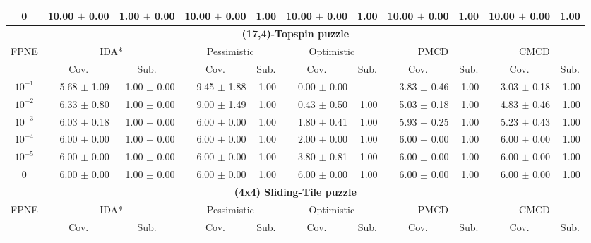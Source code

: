\documentclass[letterpaper]{article}
\begin{document}
\begin{table}[t]
\begin{tabular}{| c | r  r | r  r | r  r | r  r | r  r |}
0 	& 10.00 $\pm$ 0.00	& 1.00  $\pm$ 0.00 	& 10.00 $\pm$ 0.00	& 1.00 	& 10.00 $\pm$ 0.00	& 1.00 	& 10.00 $\pm$ 0.00	& 1.00 	& 10.00 $\pm$ 0.00	& 1.00 	\\

\hline
\hline
\multicolumn{11}{|c|}{\textbf{(17,4)-Topspin puzzle}} \\
\hline
\multirow{2}{*}{FPNE}	& \multicolumn{2}{|c|}{IDA*} 	& \multicolumn{2}{|c|}{Pessimistic} 	& \multicolumn{2}{|c|}{Optimistic} 	& \multicolumn{2}{|c|}{PMCD} 	& \multicolumn{2}{|c|}{CMCD} 	\\
\cline{2-11}
	& \multicolumn{1}{c}{Cov.} & \multicolumn{1}{c|}{Sub.} 	& \multicolumn{1}{c}{Cov.} & \multicolumn{1}{c|}{Sub.} 	& \multicolumn{1}{c}{Cov.} & \multicolumn{1}{c|}{Sub.} 	& \multicolumn{1}{c}{Cov.} & \multicolumn{1}{c|}{Sub.} 	& \multicolumn{1}{c}{Cov.} & \multicolumn{1}{c|}{Sub.} 	\\
\hline
$10^{-1}$	& 5.68 $\pm$ 1.09	& 1.00 $\pm$ 0.00	& 9.45 $\pm$ 1.88	& 1.00	& 0.00 $\pm$ 0.00	& - 	& 3.83 $\pm$ 0.46	& 1.00	& 3.03 $\pm$ 0.18	& 1.00	\\

$10^{-2}$	& 6.33 $\pm$ 0.80	& 1.00 $\pm$ 0.00	& 9.00 $\pm$ 1.49	& 1.00	& 0.43 $\pm$ 0.50	& 1.00	& 5.03 $\pm$ 0.18	& 1.00	& 4.83 $\pm$ 0.46	& 1.00	\\

$10^{-3}$	& 6.03 $\pm$ 0.18	& 1.00 $\pm$ 0.00	& 6.00 $\pm$ 0.00	& 1.00	& 1.80 $\pm$ 0.41	& 1.00	& 5.93 $\pm$ 0.25	& 1.00	& 5.23 $\pm$ 0.43	& 1.00	\\

$10^{-4}$	& 6.00 $\pm$ 0.00	& 1.00 $\pm$ 0.00	& 6.00 $\pm$ 0.00	& 1.00	& 2.00 $\pm$ 0.00	& 1.00	& 6.00 $\pm$ 0.00	& 1.00	& 6.00 $\pm$ 0.00	& 1.00	\\

$10^{-5}$	& 6.00 $\pm$ 0.00	& 1.00 $\pm$ 0.00	& 6.00 $\pm$ 0.00	& 1.00	& 3.80 $\pm$ 0.81	& 1.00	& 6.00 $\pm$ 0.00	& 1.00	& 6.00 $\pm$ 0.00	& 1.00	\\

0 	& 6.00 $\pm$ 0.00	& 1.00  $\pm$ 0.00 	& 6.00 $\pm$ 0.00	& 1.00 	& 6.00 $\pm$ 0.00	& 1.00 	& 6.00 $\pm$ 0.00	& 1.00 	& 6.00 $\pm$ 0.00	& 1.00 	\\



\hline
\hline
\multicolumn{11}{|c|}{\textbf{(4x4) Sliding-Tile puzzle}} \\
\hline
\multirow{2}{*}{FPNE}	& \multicolumn{2}{|c|}{IDA*} 	& \multicolumn{2}{|c|}{Pessimistic} 	& \multicolumn{2}{|c|}{Optimistic} 	& \multicolumn{2}{|c|}{PMCD} 	& \multicolumn{2}{|c|}{CMCD} 	\\
\cline{2-11}
	& \multicolumn{1}{c}{Cov.} & \multicolumn{1}{c|}{Sub.} 	& \multicolumn{1}{c}{Cov.} & \multicolumn{1}{c|}{Sub.} 	& \multicolumn{1}{c}{Cov.} & \multicolumn{1}{c|}{Sub.} 	& \multicolumn{1}{c}{Cov.} & \multicolumn{1}{c|}{Sub.} 	& \multicolumn{1}{c}{Cov.} & \multicolumn{1}{c|}{Sub.} 	\\
\hline


\end{tabular}
\end{table}
\end{document}

